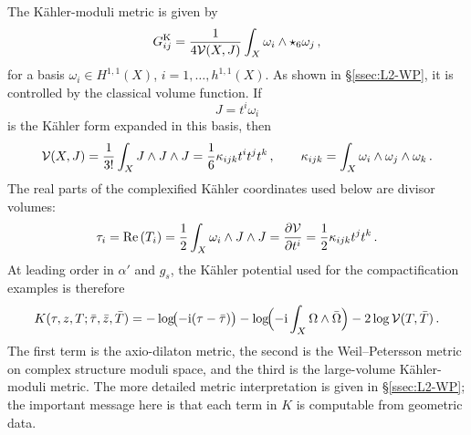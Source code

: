 The K\"ahler-moduli metric is given by
\begin{equation}
 G^{\rm K}_{ij}
    =
    \frac{1}{4\mathcal{V}(X,J)}
    \int_X\omega_i\wedge\star_6\omega_j\, ,
\end{equation}
for a basis $\omega_i\in H^{1,1}(X)$, $i=1,\ldots,h^{1,1}(X)$. As
shown in \S\ref{ssec:L2-WP}, it is controlled by the classical volume
function.  If
\begin{equation}
    J=t^i\omega_i
\end{equation}
is the K\"ahler form expanded in this basis, then
\begin{equation}\label{eq:L2-volume-intro}
    \mathcal{V}(X,J)
    =
    \frac{1}{3!}\int_X J\wedge J\wedge J
    =
    \frac{1}{6}\kappa_{ijk}t^it^jt^k\, ,
    \qquad
    \kappa_{ijk}=\int_X\omega_i\wedge\omega_j\wedge\omega_k\, .
\end{equation}
The real parts of the complexified K\"ahler coordinates used below are
divisor volumes:
\begin{equation}\label{eq:tauAdef}
    \tau_i
    =
    \mathrm{Re}\,(T_i)
    =
    \frac12\int_X\omega_i\wedge J\wedge J
    =
    \frac{\partial\mathcal{V}}{\partial t^i}
    =
    \frac12\kappa_{ijk}t^jt^k\, .
\end{equation}
At leading order in $\alpha'$ and $g_s$, the K\"ahler potential used
for the compactification examples is therefore
\begin{equation}\label{eq:K-full}
    K(\tau,z,T;\bar\tau,\bar z,\bar T)
    =
    -\log\!\bigl(-\mathrm{i}(\tau-\bar\tau)\bigr)
    -\log\!\Bigl(-\mathrm{i}\int_X\Omega\wedge\bar\Omega\Bigr)
    -2\log\mathcal{V}(T,\bar T)\, .
\end{equation}
The first term is the axio-dilaton metric, the second is the
Weil--Petersson metric on complex structure moduli space, and the
third is the large-volume K\"ahler-moduli metric.  The more detailed
metric interpretation is given in \S\ref{ssec:L2-WP}; the important
message here is that each term in $K$ is computable from geometric
data.

